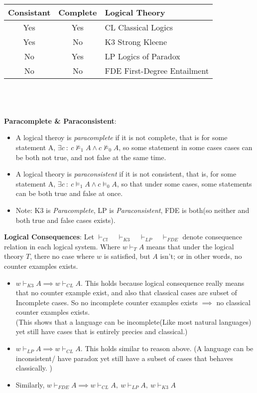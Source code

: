 \documentclass{article}
\begin{document}
\begin{tabular}{c | c| l}
    \hline
    Consistant & Complete & Logical Theory\\
    \hline
    Yes & Yes & CL Classical Logics\\
    
    Yes & No & K3 Strong Kleene\\
    No & Yes & LP Logics of Paradox \\
    No & No & FDE First-Degree Entailment\\
    \hline
    
\end{tabular}\\  \\ \\


\noindent\textbf{Paracomplete \& Paraconsistent}: 
\begin{itemize}
    \large
    \item A logical theroy is \emph{paracomplete} 
    if it is not complete, that is for some statement A, $\exists c\ :\  c\not \models_1 A \wedge c \not \models_0 A$,
    so some statement in some cases cases can be both not true, and not false at the same time.
    \item A logical theory is \emph{paraconsistent} if it is not consistent, that is, for some statement A, 
    $\exists c \ :\ c \models_1 A \wedge c \models_0 A$, so that under some cases, some statements can be 
    both true and false at once.
    \item Note: K3 is \emph{Paracomplete}, LP is \emph{Paraconsistent}, FDE is both(so neither and both true and false cases exists).
    
\end{itemize}
\bigskip

\noindent \textbf{Logical Consequences}: 
Let $\vdash_{Cl}\quad \vdash_{K3} \quad \vdash_{LP}\quad \vdash_{FDE}$ denote consequence relation in each logical system. 
Where $w \vdash_T A$ means that under the logical theory $T$, there no case where $w$ is satisfied, but $A$ isn't; or in other words,
no counter examples exists.
\begin{itemize}
    \item {$w\vdash_{K3}A \implies w\vdash_{CL} A$. This holds because logical consequence really means
     that no counter example exist, and also that classical cases are subset of Incomplete cases. So no 
     incomplete counter examples exists $\implies$ no classical counter examples exists. \\
     (This shows that a language can be incomplete(Like most natural languages) yet still have cases that is entirely precies and classical.) } 
     \item {$w\vdash_{LP}A \implies w\vdash_{CL} A$. This holds similar to reason above. (A language 
     can be inconsistent/ have paradox yet still have a subset of cases that behaves classically.
     )}
     \item Similarly, $w\vdash_{FDE}A \implies w\vdash_{CL} A, \ w\vdash_{LP}A, \ w\vdash_{K3}A$

\end{itemize}
\end{document}

